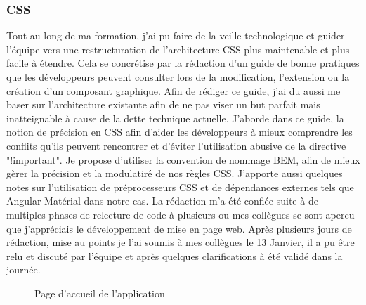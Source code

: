 \documentclass[12pt, a4paper]{report}
\newcommand\tab[1][1cm]{\hspace*{#1}}
\begin{document}
\subsubsection{CSS}
\tab{}Tout au long de ma formation, j'ai pu faire de la veille technologique et guider l'équipe vers une restructuration de l'architecture CSS plus maintenable et plus facile à étendre.\newline
Cela se concrétise par la rédaction d'un guide de bonne pratiques que les développeurs peuvent consulter lors de la modification, l'extension ou la création d'un composant graphique.
Afin de rédiger ce guide, j'ai du aussi me baser sur l'architecture existante afin de ne pas viser un but parfait mais inatteignable à cause de la dette technique actuelle.\newline
J'aborde dans ce guide, la notion de précision en CSS afin d'aider les développeurs à mieux comprendre les conflits qu'ils peuvent rencontrer et d'éviter l'utilisation abusive de la directive "!important". Je propose d'utiliser la convention de nommage BEM, afin de mieux gèrer la précision et la modulatiré de nos règles CSS. J'apporte aussi quelques notes sur l'utilisation de préprocesseurs CSS et de dépendances externes tels que Angular Matérial dans notre cas.\newline
La rédaction m'a été confiée suite à de multiples phases de relecture de code à plusieurs ou mes collègues se sont apercu que j'appréciais le développement de mise en page web. Après plusieurs jours de rédaction, mise au points je l'ai soumis à mes collègues le 13 Janvier, il a pu être relu et discuté par l'équipe et après quelques clarifications à été validé dans la journée.\newline
\begin{figure}[H]
    \begin{center}
    \end{center}
    \caption{Page d'accueil de l'application}
\end{figure}
\end{document}
